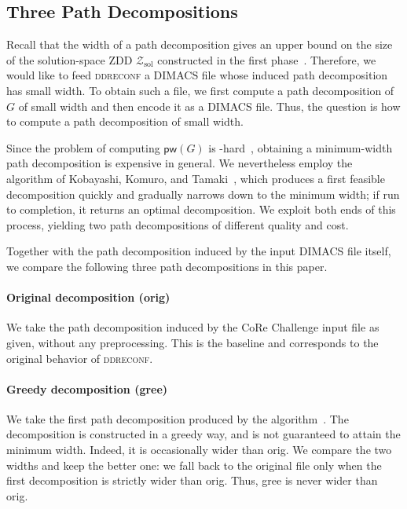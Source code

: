 \documentclass[conference]{IEEEtran}
\newcommand{\zsol}{\mathcal{Z}_{\mathrm{sol}}}
\newcommand{\OrigDecom}{\textsf{orig}\xspace}
\newcommand{\HeurDecom}{\textsf{gree}\xspace}
\begin{document}
\subsection{Three Path Decompositions}
\label{subsec:algorithms}

Recall that the width of a path decomposition gives an upper bound on the size of the solution-space ZDD $\zsol$ constructed in the first phase~\cite{inoue16}.
Therefore, we would
like to feed \textsc{ddreconf} a DIMACS file whose induced path decomposition
has small width. To obtain such a file, we first compute a path decomposition of
$G$ of small width and then encode it as a DIMACS file.
Thus, the question is how to compute a path decomposition of small width.

Since the problem of computing $\mathsf{pw}(G)$ is \NP-hard~\cite{ACP97}, obtaining a
minimum-width path decomposition is expensive in general.
We nevertheless employ the algorithm of Kobayashi, Komuro, and Tamaki~\cite{KobayashiKomuroTamaki2014},
which produces a first feasible decomposition quickly and gradually narrows down
to the minimum width; if run to completion, it returns an optimal
decomposition. We exploit both ends of this process, yielding two path
decompositions of different quality and cost. 

Together with the path decomposition induced by the input DIMACS file itself, we compare the
following three path decompositions in this paper.

\paragraph{Original decomposition (\OrigDecom)}
We take the path decomposition induced by the CoRe Challenge input
file as given, without any preprocessing. This is the baseline and
corresponds to the original behavior of \textsc{ddreconf}.

\paragraph{Greedy decomposition (\HeurDecom)}
We take the first path decomposition produced by the
algorithm~\cite{KobayashiKomuroTamaki2014}.
The decomposition is constructed in a greedy way, and is not guaranteed to attain
the minimum width.
Indeed, it is occasionally wider than \OrigDecom.
We compare the two widths and keep the better one:
we fall back to the original file only when the first decomposition is strictly
wider than \OrigDecom. 
Thus, \HeurDecom is never wider than \OrigDecom.
\end{document}
